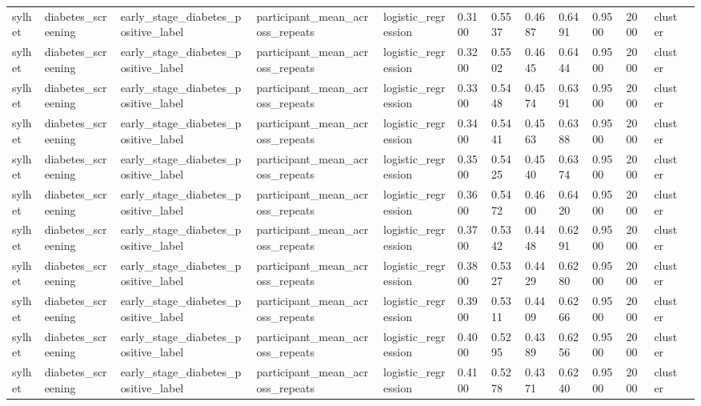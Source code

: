 \begin{tabular}{lllllllllllll}
sylhet & diabetes\_screening & early\_stage\_diabetes\_positive\_label & participant\_mean\_across\_repeats & logistic\_regression & 0.3100 & 0.5537 & 0.4687 & 0.6491 & 0.9500 & 2000 & cluster &  \\
sylhet & diabetes\_screening & early\_stage\_diabetes\_positive\_label & participant\_mean\_across\_repeats & logistic\_regression & 0.3200 & 0.5502 & 0.4645 & 0.6444 & 0.9500 & 2000 & cluster &  \\
sylhet & diabetes\_screening & early\_stage\_diabetes\_positive\_label & participant\_mean\_across\_repeats & logistic\_regression & 0.3300 & 0.5448 & 0.4574 & 0.6391 & 0.9500 & 2000 & cluster &  \\
sylhet & diabetes\_screening & early\_stage\_diabetes\_positive\_label & participant\_mean\_across\_repeats & logistic\_regression & 0.3400 & 0.5441 & 0.4563 & 0.6388 & 0.9500 & 2000 & cluster &  \\
sylhet & diabetes\_screening & early\_stage\_diabetes\_positive\_label & participant\_mean\_across\_repeats & logistic\_regression & 0.3500 & 0.5425 & 0.4540 & 0.6374 & 0.9500 & 2000 & cluster &  \\
sylhet & diabetes\_screening & early\_stage\_diabetes\_positive\_label & participant\_mean\_across\_repeats & logistic\_regression & 0.3600 & 0.5472 & 0.4600 & 0.6420 & 0.9500 & 2000 & cluster &  \\
sylhet & diabetes\_screening & early\_stage\_diabetes\_positive\_label & participant\_mean\_across\_repeats & logistic\_regression & 0.3700 & 0.5342 & 0.4448 & 0.6291 & 0.9500 & 2000 & cluster &  \\
sylhet & diabetes\_screening & early\_stage\_diabetes\_positive\_label & participant\_mean\_across\_repeats & logistic\_regression & 0.3800 & 0.5327 & 0.4429 & 0.6280 & 0.9500 & 2000 & cluster &  \\
sylhet & diabetes\_screening & early\_stage\_diabetes\_positive\_label & participant\_mean\_across\_repeats & logistic\_regression & 0.3900 & 0.5311 & 0.4409 & 0.6266 & 0.9500 & 2000 & cluster &  \\
sylhet & diabetes\_screening & early\_stage\_diabetes\_positive\_label & participant\_mean\_across\_repeats & logistic\_regression & 0.4000 & 0.5295 & 0.4389 & 0.6256 & 0.9500 & 2000 & cluster &  \\
sylhet & diabetes\_screening & early\_stage\_diabetes\_positive\_label & participant\_mean\_across\_repeats & logistic\_regression & 0.4100 & 0.5278 & 0.4371 & 0.6240 & 0.9500 & 2000 & cluster &  \\

\end{tabular}

